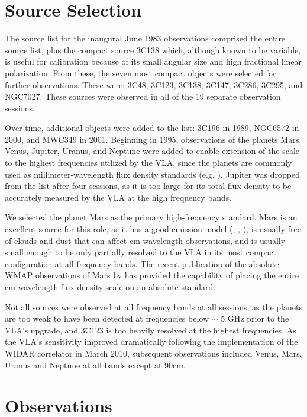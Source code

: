 \documentclass{aastex}
\begin{document}
\section{Source Selection}

The source list for the inaugural June 1983 observations comprised the
entire \citet{Baa77} source list, plus the compact source 3C138 which,
although known to be variable, is useful for calibration because of
its small angular size and high fractional linear polarization.  From
these, the seven most compact objects were selected for further
observations.  These were: 3C48, 3C123, 3C138, 3C147, 3C286, 3C295, and
NGC7027.  These sources were observed in all of the 19 separate
observation sessions.  
  
Over time, additional objects were added to the list: 3C196 in 1989,
NGC6572 in 2000, and MWC349 in 2001.  Beginning in 1995, observations
of the planets Mars, Venus, Jupiter, Uranus, and Neptune were added to
enable extension of the scale to the highest frequencies utilized by
the VLA, since the planets are commonly used as millimeter-wavelength
flux density standards (e.g. \citet{Gri93}).  Jupiter was dropped from
the list after four sessions, as it is too large for its total flux
density to be accurately measured by the VLA at the high frequency
bands.

We selected the planet Mars as the primary high-frequency standard.
Mars is an excellent source for this role, as it has a good emission
model (\citet{Rud87}, \citet{Muh91}, \citet{Sid00}), is usually free
of clouds and dust that can affect cm-wavelength observations, and is
usually small enough to be only partially resolved to the VLA in its
most compact configuration at all frequency bands.  The recent
publication of the absolute WMAP observations of Mars by \citet{Wei11}
has provided the capability of placing the entire cm-wavelength flux
density scale on an absolute standard.

Not all sources were observed at all frequency bands at all sessions,
as the planets are too weak to have been detected at frequencies below
$\sim$ 5 GHz prior to the VLA's upgrade, and 3C123 is too heavily
resolved at the highest frequencies.  As the VLA's sensitivity
improved dramatically following the implementation of the WIDAR
correlator in March 2010, subsequent observations included Venus,
Mars, Uranus and Neptune at all bands except at 90cm.

\section{Observations}
\end{document}
